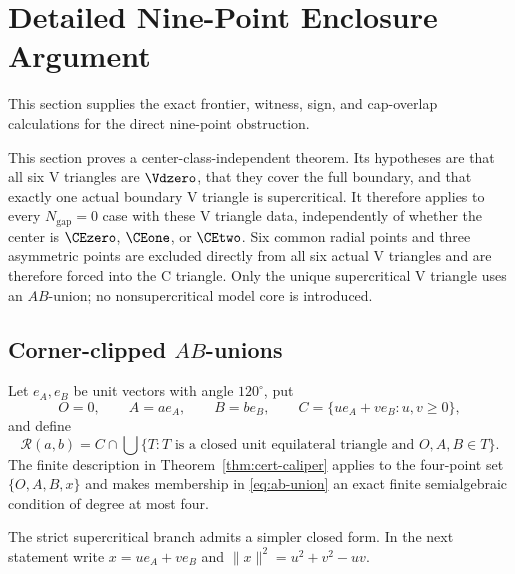 \section{Detailed Nine-Point Enclosure Argument}
\label{sec:ab-core}

This section supplies the exact frontier, witness, sign, and cap-overlap
calculations for the direct nine-point obstruction.

This section proves a center-class-independent theorem.  Its hypotheses are
that all six V triangles are $\Vdzero$, that they cover the full boundary,
and that exactly one actual boundary V triangle is supercritical.  It therefore
applies to every $N_{\mathrm{gap}}=0$ case with these V triangle data,
independently of whether the center is $\CEzero$, $\CEone$, or $\CEtwo$.
Six common radial points and three asymmetric points
are excluded directly from all six actual V triangles and are therefore
forced into the C triangle.  Only the unique supercritical V triangle uses an
$AB$-union; no nonsupercritical model core is introduced.



\subsection{Corner-clipped $AB$-unions}

Let $e_A,e_B$ be unit vectors with angle $120^\circ$, put
\[
 O=0,\qquad A=ae_A,\qquad B=be_B,
 \qquad
 C=\{ue_A+ve_B:u,v\ge0\},
\]
and define
\begin{equation}
 \mathcal R(a,b)=
 C\cap\bigcup\{T:T\text{ is a closed unit equilateral triangle and }
 O,A,B\in T\}.                               \label{eq:ab-union}
\end{equation}
The finite description in Theorem~\ref{thm:cert-caliper} applies to the
four-point set $\{O,A,B,x\}$ and makes membership in \eqref{eq:ab-union} an
exact finite semialgebraic condition of degree at most four.

The strict supercritical branch admits a simpler closed form.  In the next
statement write $x=ue_A+ve_B$ and
$\lVert x\rVert^2=u^2+v^2-uv$.

